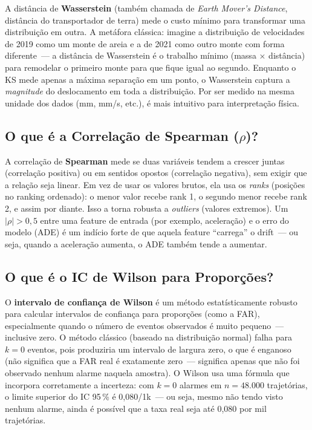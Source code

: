 \documentclass[11pt,a4paper]{article}
\begin{document}
A dist\^ancia de \textbf{Wasserstein} (tamb\'em chamada de \emph{Earth Mover's Distance}, dist\^ancia do transportador de terra) mede o custo m\'inimo para transformar uma distribui\c{c}\~ao em outra. A met\'afora cl\'assica: imagine a distribui\c{c}\~ao de velocidades de 2019 como um monte de areia e a de 2021 como outro monte com forma diferente~--- a dist\^ancia de Wasserstein \'e o trabalho m\'inimo (massa $\times$ dist\^ancia) para remodelar o primeiro monte para que fique igual ao segundo. Enquanto o KS mede apenas a m\'axima separa\c{c}\~ao em um ponto, o Wasserstein captura a \emph{magnitude} do deslocamento em toda a distribui\c{c}\~ao. Por ser medido na mesma unidade dos dados (mm, mm/s, etc.), \'e mais intuitivo para interpreta\c{c}\~ao f\'isica.

\subsection*{O que \'e a Correla\c{c}\~ao de Spearman ($\rho$)?}

A correla\c{c}\~ao de \textbf{Spearman} mede se duas vari\'aveis tendem a crescer juntas (correla\c{c}\~ao positiva) ou em sentidos opostos (correla\c{c}\~ao negativa), sem exigir que a rela\c{c}\~ao seja linear. Em vez de usar os valores brutos, ela usa os \emph{ranks} (posi\c{c}\~oes no ranking ordenado): o menor valor recebe rank 1, o segundo menor recebe rank 2, e assim por diante. Isso a torna robusta a \emph{outliers} (valores extremos). Um $|\rho| > 0{,}5$ entre uma feature de entrada (por exemplo, acelera\c{c}\~ao) e o erro do modelo (ADE) \'e um ind\'icio forte de que aquela feature ``carrega'' o drift~--- ou seja, quando a acelera\c{c}\~ao aumenta, o ADE tamb\'em tende a aumentar.

\subsection*{O que \'e o IC de Wilson para Propor\c{c}\~oes?}

O \textbf{intervalo de confian\c{c}a de Wilson} \'e um m\'etodo estat\'isticamente robusto para calcular intervalos de confian\c{c}a para propor\c{c}\~oes (como a FAR), especialmente quando o n\'umero de eventos observados \'e muito pequeno~--- inclusive zero. O m\'etodo cl\'assico (baseado na distribui\c{c}\~ao normal) falha para $k = 0$ eventos, pois produziria um intervalo de largura zero, o que \'e enganoso (n\~ao significa que a FAR real \'e exatamente zero~--- significa apenas que n\~ao foi observado nenhum alarme naquela amostra). O Wilson usa uma f\'ormula que incorpora corretamente a incerteza: com $k=0$ alarmes em $n = 48{.}000$ trajet\'orias, o limite superior do IC 95\,\% \'e 0{,}080/1k~--- ou seja, mesmo n\~ao tendo visto nenhum alarme, ainda \'e poss\'ivel que a taxa real seja at\'e 0{,}080 por mil trajet\'orias.
\end{document}
